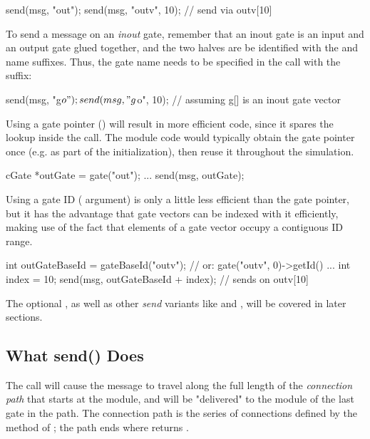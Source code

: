 \begin{cpp}
send(msg, "out");
send(msg, "outv", 10); // send via outv[10]
\end{cpp}

To send a message on an \textit{inout} gate, remember that an inout gate is an
input and an output gate glued together, and the two halves are be identified
with the  and  name suffixes. Thus, the gate name needs to be
specified in the  call with the  suffix:

\begin{cpp}
send(msg, "g$o");
send(msg, "g$o", 10); // assuming g[] is an inout gate vector
\end{cpp}

Using a gate pointer () will result in more efficient code, since it
spares the lookup inside the  call. The module code would typically
obtain the gate pointer once (e.g. as part of the initialization), then reuse
it throughout the simulation.

\begin{cpp}
cGate *outGate = gate("out");
...
send(msg, outGate);
\end{cpp}

Using a gate ID ( argument) is only a little less efficient than the
gate pointer, but it has the advantage that gate vectors can be indexed with it
efficiently, making use of the fact that elements of a gate vector occupy a
contiguous ID range.

\begin{cpp}
int outGateBaseId = gateBaseId("outv"); // or: gate("outv", 0)->getId()
...
int index = 10;
send(msg, outGateBaseId + index); // sends on outv[10]
\end{cpp}

The optional , as well as other \textit{send} variants like
 and , will be covered in later sections.

\subsection{What send() Does}
\label{sec:simple-modules:what-send-does}

The  call will cause the message to travel along the full length
of the \textit{connection path} that starts at the module, and will be
"delivered" to the module of the last gate in the path. The connection path is
the series of connections defined by the  method of
; the path ends where  returns .

